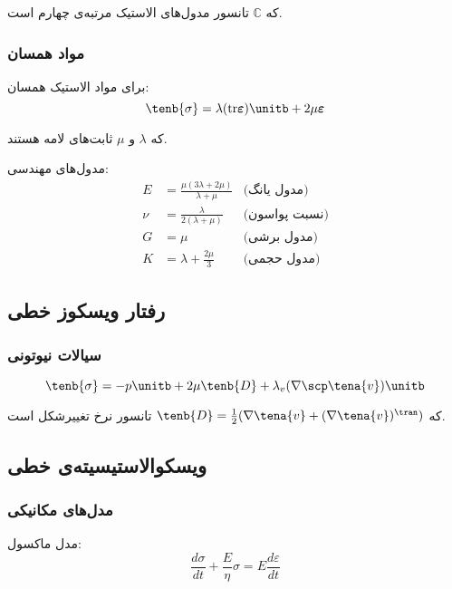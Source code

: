 که $\mathbb{C}$ تانسور مدول‌های الاستیک مرتبه‌ی چهارم است.

\subsubsection{مواد همسان}
برای مواد الاستیک همسان:
\begin{equation}
	\tenb{\sigma} = \lambda (\text{tr} \boldsymbol{\varepsilon}) \unitb + 2\mu \boldsymbol{\varepsilon}
\end{equation}

که $\lambda$ و $\mu$ ثابت‌های لامه هستند.

مدول‌های مهندسی:
\begin{align}
	E   & = \frac{\mu(3\lambda + 2\mu)}{\lambda + \mu} & \text{(مدول یانگ)}   \\
	\nu & = \frac{\lambda}{2(\lambda + \mu)}           & \text{(نسبت پواسون)} \\
	G   & = \mu                                        & \text{(مدول برشی)}   \\
	K   & = \lambda + \frac{2\mu}{3}                   & \text{(مدول حجمی)}
\end{align}

\subsection{رفتار ویسکوز خطی}

\subsubsection{سیالات نیوتونی}
\begin{equation}
	\tenb{\sigma} = -p \unitb + 2\mu \tenb{D} + \lambda_v (\nabla \scp \tena{v}) \unitb
\end{equation}

که $\tenb{D} = \frac{1}{2}(\nabla \tena{v} + (\nabla \tena{v})^\tran)$ تانسور نرخ تغییرشکل است.

\subsection{ویسکوالاستیسیته‌ی خطی}

\subsubsection{مدل‌های مکانیکی}
مدل ماکسول:
\begin{equation}
	\frac{d\sigma}{dt} + \frac{E}{\eta} \sigma = E \frac{d\varepsilon}{dt}
\end{equation}

